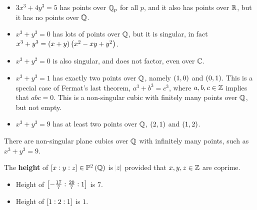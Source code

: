 \begin{example*}
\hfill
\begin{itemize}
\item $ 3x^3 + 4y^3 = 5 $ has points over $ \mathbb{Q}_p $ for all $ p $, and it also has points over $ \mathbb{R} $, but it has no points over $ \mathbb{Q} $.
\item $ x^3 + y^3 = 0 $ has lots of points over $ \mathbb{Q} $, but it is singular, in fact $ x^3 + y^3 = \br{x + y}\br{x^2 - xy + y^2} $.
\item $ x^3 + y^2 = 0 $ is also singular, and does not factor, even over $ \mathbb{C} $.
\item $ x^3 + y^3 = 1 $ has exactly two points over $ \mathbb{Q} $, namely $ \br{1, 0} $ and $ \br{0, 1} $. This is a special case of Fermat's last theorem, $ a^3 + b^3 = c^3 $, where $ a, b, c \in \mathbb{Z} $ implies that $ abc = 0 $. This is a non-singular cubic with finitely many points over $ \mathbb{Q} $, but not empty.
\item $ x^3 + y^3 = 9 $ has at least two points over $ \mathbb{Q} $, $ \br{2, 1} $ and $ \br{1, 2} $.
\end{itemize}
\end{example*}

\begin{lemma}
There are non-singular plane cubics over $ \mathbb{Q} $ with infinitely many points, such as $ x^3 + y^3 = 9 $.
\end{lemma}

The \textbf{height} of $ \sbr{x : y : z} \in \PP^2\br{\QQ} $ is $ \abs{z} $ provided that $ x, y, z \in \mathbb{Z} $ are coprime.

\begin{example*}
\hfill
\begin{itemize}
\item Height of $ \sbr{-\tfrac{17}{7} : \tfrac{20}{7} : 1} $ is $ 7 $.
\item Height of $ \sbr{1 : 2 : 1} $ is $ 1 $.
\end{itemize}
\end{example*}

